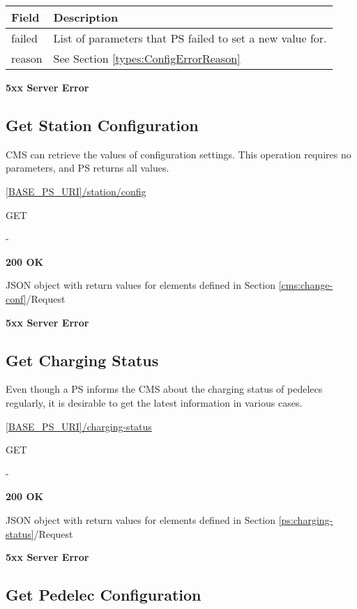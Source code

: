\begin{tabularx}{\linewidth}{ | l | X | }
  \hline
  \rowcolor{table-head}
  Field & Description \\
  \hline
  failed		& List of parameters that \acs{PS} failed to set a new value for.\\
  reason 	& See Section \ref{types:ConfigErrorReason} \\
  \hline
\end{tabularx}

\textbf{5xx Server Error}

\subsection{Get Station Configuration}

\acs{CMS} can retrieve the values of configuration settings. This operation requires no parameters, and \acs{PS} returns all values.

 \url{[BASE_PS_URI]/station/config}

 GET

 -

 \textbf{200 OK}

JSON object with return values for elements defined in Section \ref{cms:change-conf}/Request

 \textbf{5xx Server Error}

\subsection{Get Charging Status}

Even though a \acs{PS} informs the \acs{CMS} about the charging status of pedelecs regularly, it is desirable to get the latest information in various cases.

 \url{[BASE_PS_URI]/charging-status}

 GET

 -

 \textbf{200 OK}

JSON object with return values for elements defined in Section \ref{ps:charging-status}/Request

 \textbf{5xx Server Error}

\subsection{Get Pedelec Configuration}


